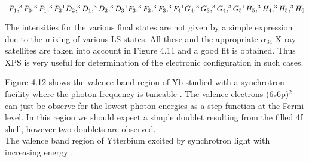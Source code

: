 \vspace{0.3cm}


    \noindent      $^{1}P_{1}, ^{3}P_{0}, ^{3}P_{1}, ^{3}P_{2}\\ ^{1}D_{2},
          ^{3}D_{1}, ^{3}D_{2}, ^{3}D_{3}\\ ^{1}F_{3}, ^{3}F_{2},
          ^{3}F_{3}, ^{3}F_{4}\\ ^{1}G_{4}, ^{3}G_{3}, ^{3}G_{4},
          ^{3}G_{5}\\ ^{1}H_{5}, ^{3}H_{4}, ^{3}H_{5}, ^{3}H_{6} $\\

          \vspace{0.3cm}

             The intensities for the various final states are not given
          by a simple expression due to the mixing of various LS
          states. All these and the appropriate $\alpha_{34}$ X-ray
          satellites are taken into account in Figure 4.11 and a good
          fit is obtained. Thus XPS is very useful for determination
          of the electronic configuration in such cases.

             Figure 4.12 shows the valence band region of Yb studied
          with a synchrotron facility where the photon frequency is
          tuneable \cite{gerken}. The valence  electrons  (6s6p)$^{2}$
          can just be observe for the lowest photon energies as a step
          function at the Fermi level. In this region we should expect
          a simple doublet resulting from the filled 4f shell, however
          two doublets are observed.\\

             \vspace*{12.5cm}
           The valence band region of
          Ytterbium excited by synchrotron light with increasing energy \cite{gerken}.\\


